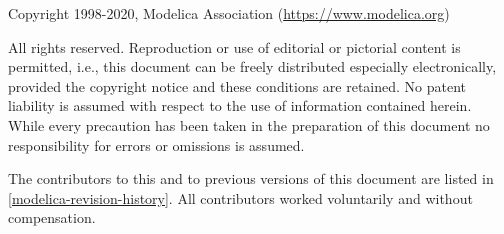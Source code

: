 Copyright \textcopyright{} 1998-2020, Modelica Association (\url{https://www.modelica.org})

All rights reserved.
Reproduction or use of editorial or pictorial content is permitted, i.e., this document can be freely distributed especially electronically, provided the copyright notice and these conditions are retained.
No patent liability is assumed with respect to the use of information contained herein.
While every precaution has been taken in the preparation of this document no responsibility for errors or omissions is assumed.

The contributors to this and to previous versions of this document are listed in \cref{modelica-revision-history}.
All contributors worked voluntarily and without compensation.
